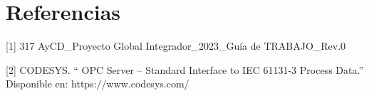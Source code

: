 \documentclass{article}
\begin{document}
\section{Referencias}\label{sec:referencias}

[1] 317 AyCD\_Proyecto Global Integrador\_2023\_Guía de TRABAJO\_Rev.0 

[2] CODESYS. `` OPC Server – Standard Interface to IEC 61131-3 Process Data.'' Disponible en: https://www.codesys.com/



%

%
\end{document}
